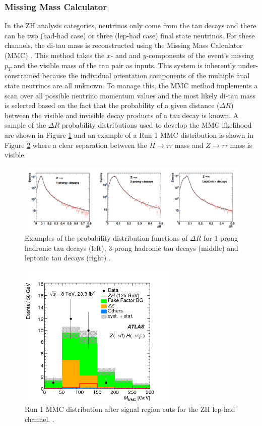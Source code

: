 \subsubsection{Missing Mass Calculator}\label{sec:mass_recon}
In the ZH analysis categories, neutrinos only come from the tau decays and there can be two (had-had case) or three (lep-had case) final state neutrinos. For these channels, the di-tau mass is reconstructed using the Missing Mass Calculator (MMC) \cite{mmc}. This method takes the $x$- and  and $y$-components of the event's missing $p_T$ and the visible mass of the tau pair as inputs. This system is inherently under-constrained because the individual orientation components of the multiple final state neutrinos are all unknown. To manage this, the MMC method implements a scan over all possible neutrino momentum values and the most likely di-tau mass is selected based on the fact that the probability of a given distance ($\Delta R$) between the visible and invisible decay products of a tau decay is known. A sample of the $\Delta R$ probability distributions used to develop the MMC likelihood are shown in Figure \ref{fig:mmc_probs} and an example of a Run 1 MMC distribution is shown in Figure \ref{fig:mmc_run1} where a clear separation between the $H\rightarrow \tau\tau$ mass and $Z\rightarrow\tau\tau$ mass is visible. 

\begin{figure}[htb!]
    \centering
    \includegraphics[width=5.5in]{figures/chapter6/mmc_probs.png}
    \caption{Examples of the probability distribution functions of $\Delta R$ for 1-prong hadronic tau decays (left), 3-prong hadronic tau decays (middle) and leptonic tau decays (right) \cite{mmc}.}
    \label{fig:mmc_probs}
\end{figure}

\begin{figure}[htb!]
    \centering
    \includegraphics[width=3in]{figures/chapter6/mmc_run1.png}
    \caption{Run 1 MMC distribution after signal region cuts for the ZH lep-had channel. \cite{vh_run1_paper}.}
    \label{fig:mmc_run1}
\end{figure}


